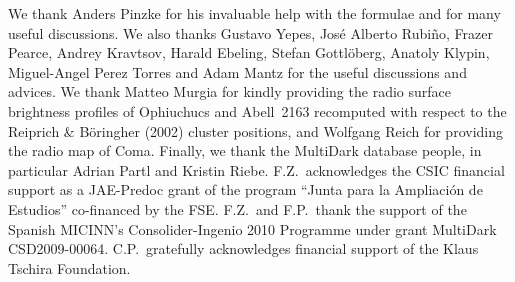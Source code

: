 \documentclass[traditabstract]{aa}
\begin{document}
\begin{acknowledgements}
  We thank Anders Pinzke for his invaluable help with the formulae and for many
  useful discussions. We also thanks Gustavo Yepes, Jos\'e Alberto Rubi\~no,
  Frazer Pearce, Andrey Kravtsov, Harald Ebeling, Stefan Gottl{\"o}berg, Anatoly
  Klypin, Miguel-Angel Perez Torres and Adam Mantz for the useful discussions
  and advices. We thank Matteo Murgia for kindly providing the radio surface
  brightness profiles of Ophiuchucs and Abell~2163 recomputed with respect to
  the Reiprich \& B\"{o}ringher (2002) cluster positions, and Wolfgang Reich for
  providing the radio map of Coma. Finally, we thank the MultiDark database
  people, in particular Adrian Partl and Kristin Riebe.  F.Z.{\ }acknowledges
  the CSIC financial support as a JAE-Predoc grant of the program ``Junta para
  la Ampliaci\'on de Estudios'' co-financed by the FSE. F.Z.{\ }and F.P.{\ }thank the 
  support of the Spanish MICINN's Consolider-Ingenio 2010 Programme under grant 
  MultiDark CSD2009-00064. C.P.{\ }gratefully
  acknowledges financial support of the Klaus Tschira Foundation.
\end{acknowledgements}




\end{document}
